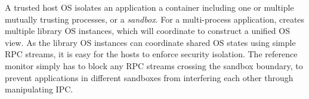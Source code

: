 


A trusted host OS isolates an application a container including one or multiple mutually trusting processes, or a {\em sandbox}.
For a multi-process application, \graphene{} creates multiple library OS instances,
which will coordinate to construct a unified OS view.
As the library OS instances can coordinate shared OS states using simple RPC streams,
it is easy for the hosts to enforce security isolation.
The reference monitor simply has to block any RPC streams crossing the sandbox boundary,
to prevent applications in different sandboxes from interfering each other through manipulating IPC.

